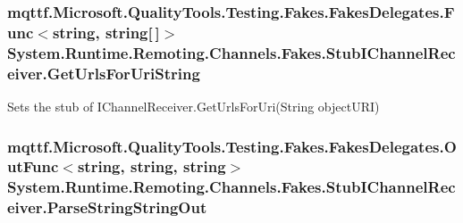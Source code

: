 \hypertarget{class_system_1_1_runtime_1_1_remoting_1_1_channels_1_1_fakes_1_1_stub_i_channel_receiver_a2f132dd7096ebca0fdd0f113e1c4c391}{
\subsubsection[{Get\-Urls\-For\-Uri\-String}]{\setlength{\rightskip}{0pt plus 5cm}mqttf.\-Microsoft.\-Quality\-Tools.\-Testing.\-Fakes.\-Fakes\-Delegates.\-Func$<$string, string\mbox{[}$\,$\mbox{]}$>$ System.\-Runtime.\-Remoting.\-Channels.\-Fakes.\-Stub\-I\-Channel\-Receiver.\-Get\-Urls\-For\-Uri\-String}}\label{class_system_1_1_runtime_1_1_remoting_1_1_channels_1_1_fakes_1_1_stub_i_channel_receiver_a2f132dd7096ebca0fdd0f113e1c4c391}


Sets the stub of I\-Channel\-Receiver.\-Get\-Urls\-For\-Uri(\-String object\-U\-R\-I)

\hypertarget{class_system_1_1_runtime_1_1_remoting_1_1_channels_1_1_fakes_1_1_stub_i_channel_receiver_a6dabfcabca305ab19882e263b257c9c4}{
\subsubsection[{Parse\-String\-String\-Out}]{\setlength{\rightskip}{0pt plus 5cm}mqttf.\-Microsoft.\-Quality\-Tools.\-Testing.\-Fakes.\-Fakes\-Delegates.\-Out\-Func$<$string, string, string$>$ System.\-Runtime.\-Remoting.\-Channels.\-Fakes.\-Stub\-I\-Channel\-Receiver.\-Parse\-String\-String\-Out}}\label{class_system_1_1_runtime_1_1_remoting_1_1_channels_1_1_fakes_1_1_stub_i_channel_receiver_a6dabfcabca305ab19882e263b257c9c4}


